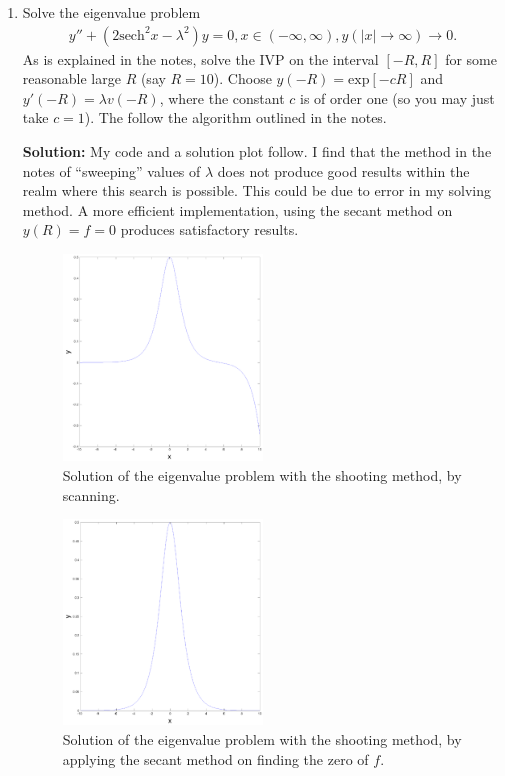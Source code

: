 \documentclass[11pt]{article}
\begin{document}
\begin{enumerate}
\item Solve the eigenvalue problem
\begin{align*} y'' + (2 \text{sech}^2 x - \lambda^2)y = 0, x \in (-\infty,\infty), y(|x|\to \infty) \to 0.\end{align*}
As is explained in the notes, solve the IVP on the interval $[-R,R]$ for some reasonable large $R$ (say $R = 10$).
Choose $y(-R) = \text{exp} [-cR]$ and $y'(-R) =\lambda v(-R)$, where the constant $c$ is of order one (so you may just take $c=1$).
The follow the algorithm outlined in the notes.

\bigskip
\textbf{Solution:} My code and a solution plot follow.
I find that the method in the notes of ``sweeping'' values of $\lambda$ does not produce good results within the realm where this search is possible.
This could be due to error in my solving method.
A more efficient implementation, using the secant method on $y(R) = f = 0$ produces satisfactory results.



\begin{figure}[h!]
  \centering
    \includegraphics[width=0.5\textwidth]{andy_hw07_prb06_01.pdf}
  \caption{Solution of the eigenvalue problem with the shooting method, by scanning.}
\end{figure}



\begin{figure}[h!]
  \centering
    \includegraphics[width=0.5\textwidth]{andy_hw07_prb06_02.pdf}
  \caption{Solution of the eigenvalue problem with the shooting method, by applying the secant method on finding the zero of $f$.}
\end{figure}


\end{enumerate}
\end{document}
